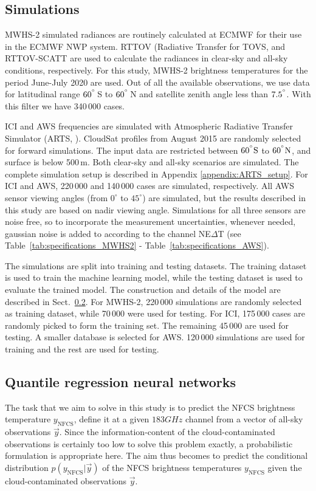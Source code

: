\documentclass[amt, manuscript]{copernicus}
\newcommand{\todo}[1]{{\color{red} #1}}
\newcommand{\ynfcs}{y_\text{NFCS}}
\newcommand{\y}{\vec{y}}
\begin{document}
\subsection{Simulations}
%
MWHS-2 simulated radiances are routinely calculated at ECMWF for their use in the ECMWF NWP system. RTTOV (Radiative Transfer for TOVS, \citet{saunders2018update} and RTTOV-SCATT \citep{bauer2006rttovscat} are used to calculate the radiances in clear-sky and all-sky conditions, respectively. For this study, MWHS-2 brightness temperatures for the period June-July 2020 are used. Out of all the available observations, we use data for latitudinal range $60^{^{\circ}}$\,S to $60^{^{\circ}}$\,N and satellite zenith angle less than $7.5^{^{\circ}}$. With this filter we have 340\,000 cases.

ICI and AWS frequencies are simulated with Atmospheric Radiative Transfer Simulator (ARTS, \citet{buehler:artst:18}). CloudSat\citep{Stephens2002cloudsat} profiles from August 2015 are randomly selected for forward simulations. The input data are restricted between $60\unit{^{\degree}S}$ to
$60\unit{^{\degree}N}$, and surface is below 500\,m. Both clear-sky and all-sky scenarios  are simulated. The complete simulation setup is described in Appendix \ref{appendix:ARTS_setup}. For ICI and AWS, 220\,000 and 140\,000 cases are simulated, respectively. All AWS sensor viewing angles (from $0^\circ$ to $45^\circ$) are simulated, but the results described in this study are based on nadir viewing angle. Simulations for all three sensors are noise free, so to incorporate the measurement uncertainties, whenever needed, gaussian noise is added to according to the channel NE$\Delta$T (see Table~\ref{tab:specifications_MWHS2} - Table~\ref{tab:specifications_AWS}). 

The simulations are split into training and testing datasets. The training dataset is used to train the machine learning model, while the testing dataset is used to evaluate the trained model. The construction and details of the model are described in Sect.~\ref{sec:QRNN}. For MWHS-2, 220\,000 simulations are randomly selected as training dataset, while 70\,000 were used for testing. For ICI, 175\,000 cases are randomly picked to form the training set. The remaining 45\,000 are used for testing. A smaller database is selected for AWS. 120\,000 simulations are used for training and the rest are used for testing.

\subsection{Quantile regression neural networks}
\label{sec:QRNN}
%
The task that we aim to solve in this study is to predict the NFCS brightness
temperature \todo{$\ynfcs$, define it} at a given $183\unit{GHz}$ channel from a vector of
all-sky observations $\y$. Since the information-content of the
cloud-contaminated observations is certainly too low to solve this problem
exactly, a probabilistic formulation is appropriate here. The aim thus becomes
to predict the conditional distribution $p(\ynfcs | \y)$ of the NFCS brightness
temperatures $\ynfcs$ given the cloud-contaminated observations $\y$.
\end{document}
